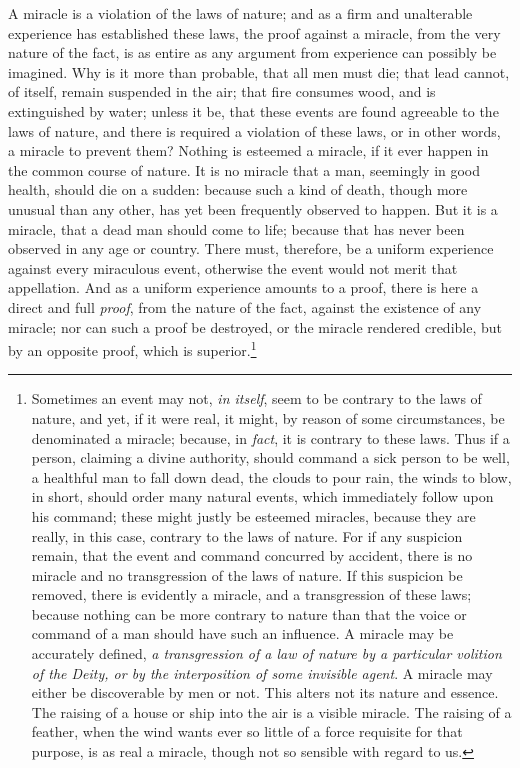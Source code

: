 \documentclass[]{article}
\newcounter{authornote}[page]
\newcommand*{\authornote}[1]{\renewcommand{\thefootnote}{\fnsymbol{footnote}}\stepcounter{authornote}\footnote[\value{authornote}]{#1}\renewcommand{\thefootnote}{\arabic{footnote}}}
\begin{document}
\begin{sectionbody}
\humeparagraph  A miracle is a violation of the laws of nature; and as a firm and unalterable experience has established these laws, the proof against a miracle, from the very nature of the fact, is as entire as any argument from experience can possibly be imagined. Why is it more than probable, that all men must die; that lead cannot, of itself, remain suspended in the air; that fire consumes wood, and is extinguished by water; unless it be, that these events are found agreeable to the laws of nature, and there is required a violation of these laws, or in other words, a miracle to prevent them? Nothing is esteemed a miracle, if it ever happen in the common course of nature. It is no miracle that a man, seemingly in good health, should die on a sudden: because such a kind of death, though more unusual than any other, has yet been frequently observed to happen. But it is a miracle, that a dead man should come to life; because that has never been observed in any age or country. There must, therefore, be a uniform experience against every miraculous event, otherwise the event would not merit that appellation. And as a uniform experience amounts to a proof, there is here a direct and full \emph{proof}, from the nature of the fact, against the existence of any miracle; nor can such a proof be destroyed, or the miracle rendered credible, but by an opposite proof, which is superior.\authornote{Sometimes an event may not, \emph{in itself}, seem to be contrary to the laws of nature, and yet, if it were real, it might, by reason of some circumstances, be denominated a miracle; because, in \emph{fact}, it is contrary to these laws. Thus if a person, claiming a divine authority, should command a sick person to be well, a healthful man to fall down dead, the clouds to pour rain, the winds to blow, in short, should order many natural events, which immediately follow upon his command; these might justly be esteemed miracles, because they are really, in this case, contrary to the laws of nature. For if any suspicion remain, that the event and command concurred by accident, there is no miracle and no transgression of the laws of nature. If this suspicion be removed, there is evidently a miracle, and a transgression of these laws; because nothing can be more contrary to nature than that the voice or command of a man should have such an influence. A miracle may be accurately defined, \emph{a transgression of a law of nature by a particular volition of the Deity, or by the interposition of some invisible agent}. A miracle may either be discoverable by men or not. This alters not its nature and essence. The raising of a house or ship into the air is a visible miracle. The raising of a feather, when the wind wants ever so little of a force requisite for that purpose, is as real a miracle, though not so sensible with regard to us.}


\end{sectionbody}
\end{document}

